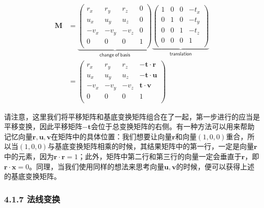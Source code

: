 \documentclass[
  paper=a4,
  ,captions=tableheading
]{scrartcl}
\begin{document}
\[
  \begin{array}{cc}
    \mathbf{M} & =
    \underbrace{
      \left( \begin{array}{cccc}
               r_x  & r_y  & r_z  & 0 \\
               u_x  & u_y  & u_z  & 0 \\
               -v_x & -v_y & -v_z & 0 \\
               0    & 0    & 0    & 1 \\
             \end{array}  \right)
    }_{\mathsf{change\ of \ basis}}

    \underbrace{
      \left( \begin{array}{cccc}
               1 & 0 & 0 & -t_x \\
               0 & 1 & 0 & -t_y \\
               0 & 0 & 1 & -t_z \\
               0 & 0 & 0 & 1    \\
             \end{array}  \right)
    }_{\mathsf{translation}}
    \\[4mm]
               & =\left( \begin{array}{cccc}
                             r_x  & r_y  & r_z  & -\mathbf{t \cdot r} \\
                             u_x  & u_y  & u_z  & -\mathbf{t \cdot u} \\
                             -v_x & -v_y & -v_z & \mathbf{t \cdot v}  \\
                             0    & 0    & 0    & 1                   \\
                           \end{array}  \right)
  \end{array}
  \tag{4.20}
\]

请注意，这里我们将平移矩阵和基底变换矩阵组合在了一起，第一步进行的应当是平移变换，因此平移矩阵\(\mathbf{-t}\)会位于总变换矩阵的右侧。有一种方法可以用来帮助记忆向量\(\mathbf{r,u,v}\)在矩阵中的具体位置：我们想要让向量\(\mathbf{r}\)和向量\((1,0,0)\)重合，所以当\((1,0,0)\)与基底变换矩阵相乘的时候，其结果矩阵中的第一行，一定是向量\(\mathbf{r}\)中的元素，因为\(\mathbf{r} \cdot \mathbf{r}=1\)；此外，矩阵中第二行和第三行的向量一定会垂直于\(\mathbf{r}\)，即\(\mathbf{r \cdot x} = 0\)。同理，当我们使用同样的想法来思考向量\(\mathbf{u,v}\)的时候，便可以获得上述的基底变换矩阵。

\subsubsection{4.1.7 法线变换}\label{ux6cd5ux7ebfux53d8ux6362}
\end{document}
